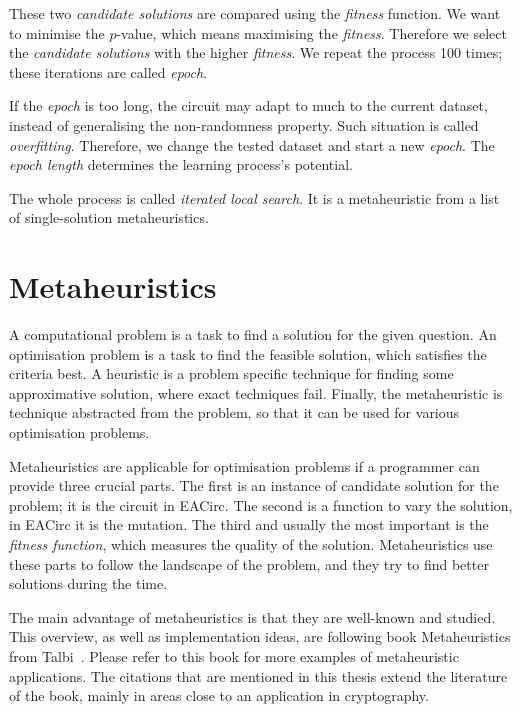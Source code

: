 \documentclass[
    digital,    %
    oneside,    %
    color,
    11pt,
    nocover,
    notable,
    nolof,
    nolot,
]{fithesis3}
\begin{document}
These two \textit{candidate solutions} are compared using the \textit{fitness} function. We want to minimise the $p$-value, which means maximising the \textit{fitness}. Therefore we select the \textit{candidate solutions} with the higher \textit{fitness}. We repeat the process 100 times; these iterations are called \textit{epoch}.

If the \textit{epoch} is too long, the circuit may adapt to much to the current dataset, instead of generalising the non-randomness property. Such situation is called \textit{overfitting}. Therefore, we change the tested dataset and start a new \textit{epoch}. The \textit{epoch length} determines the learning process's potential.

The whole process is called \textit{iterated local search}. It is a metaheuristic from a list of single-solution metaheuristics.


\chapter{Metaheuristics}
\label{chap:metaheuristics}

A computational problem is a task to find a solution for the given question. An optimisation problem is a task to find the feasible solution, which satisfies the criteria best. A heuristic is a problem specific technique for finding some approximative solution, where exact techniques fail. Finally, the metaheuristic is technique abstracted from the problem, so that it can be used for various optimisation problems.

Metaheuristics are applicable for optimisation problems if a programmer can provide three crucial parts. The first is an instance of candidate solution for the problem; it is the circuit in EACirc. The second is a function to vary the solution, in EACirc it is the mutation. The third and usually the most important is the \textit{fitness function}, which measures the quality of the solution. Metaheuristics use these parts to follow the landscape of the problem, and they try to find better solutions during the time.

The main advantage of metaheuristics is that they are well-known and studied. This overview, as well as implementation ideas, are following book Metaheuristics from Talbi~\cite{talbi2009metaheuristics}. Please refer to this book for more examples of metaheuristic applications. The citations that are mentioned in this thesis extend the literature of the book, mainly in areas close to an application in cryptography.
\end{document}
